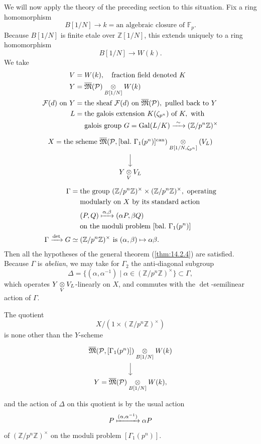 \kmitem\label{item:14.3.5}
We will now apply the theory of the preceding section to this situation. Fix a ring homomorphism
\[
B[1/N] \to k = \text{an algebraic closure of } \mathbb{F}_p .
\]
Because $B[1/N]$ is finite etale over $\mathbb{Z}[1/N]$, this extends uniquely to a ring homomorphism
\[
B[1/N] \to W(k) .
\]
We take
\begin{align*}
V &= W(k), \quad\text{fraction field denoted } K \\
Y &= \overline{\mathfrak{M}}(\mathcal{P}) \underset{B[1/N]}{\otimes} W(k) \\
\mathcal{F}(d) \text{ on } Y &= \text{the sheaf } \mathcal{F}(d) \text{ on } \overline{\mathfrak{M}}(\mathcal{P}), \text{ pulled back to } Y \\
L &= \text{the galois extension } K(\zeta_{p^n}) \text{ of } K, \text{ with} \\
&\quad\ \text{galois group } G = \operatorname{Gal}(L/K) \xrightarrow{\ \sim\ } (\mathbb{Z}/p^n\mathbb{Z})^\times
\end{align*}
\[
\begin{tikzcd}[row sep=1.8em]
X = \text{the scheme } \overline{\mathfrak{M}}(\mathcal{P}, [\mathrm{bal.}\ \Gamma_1(p^n)]^{\mathrm{can}}) \tens{B[1/N, \zeta_{p^n}]} (V_L) \arrow[d] \\
Y \tens{V} V_L
\end{tikzcd}
\]
\begin{align*}
\Gamma &= \text{the group } (\mathbb{Z}/p^n\mathbb{Z})^\times \times (\mathbb{Z}/p^n\mathbb{Z})^\times, \text{ operating} \\
&\quad\ \text{modularly on } X \text{ by its standard action} \\
&\quad\ (P, Q) \xmapsto{\alpha, \beta} (\alpha P, \beta Q) \\
&\quad\ \text{on the moduli problem } [\mathrm{bal.}\ \Gamma_1(p^n)] \\
\Gamma \xrightarrow{\det} G &\simeq (\mathbb{Z}/p^n\mathbb{Z})^\times \text{ is } (\alpha, \beta) \mapsto \alpha\beta .
\end{align*}
Then all the hypotheses of the general theorem (\ref{thm:14.2.4}) are satisfied. Because $\Gamma$ is \emph{abelian}, we may take for $\Gamma_2$ the anti-diagonal subgroup
\[
\Delta = \{(\alpha, \alpha^{-1}) \mid \alpha \in (\mathbb{Z}/p^n\mathbb{Z})^\times\} \subset \Gamma ,
\]
which operates $Y \underset{V}{\otimes} V_L$-linearly on $X$, and commutes with the $\det$-semilinear action of $\Gamma$.

The quotient
\[
X/(1 \times (\mathbb{Z}/p^n\mathbb{Z})^\times)
\]
is none other than the $Y$-scheme
\[
\begin{tikzcd}[row sep=1.8em]
\overline{\mathfrak{M}}(\mathcal{P}, [\Gamma_1(p^n)]) \tens{B[1/N]} W(k) \arrow[d] \\
Y = \overline{\mathfrak{M}}(\mathcal{P}) \tens{B[1/N]} W(k) ,
\end{tikzcd}
\]
and the action of $\Delta$ on this quotient is by the usual action
\[
P \xmapsto{(\alpha, \alpha^{-1})} \alpha P
\]
of $(\mathbb{Z}/p^n\mathbb{Z})^\times$ on the moduli problem $[\Gamma_1(p^n)]$.

